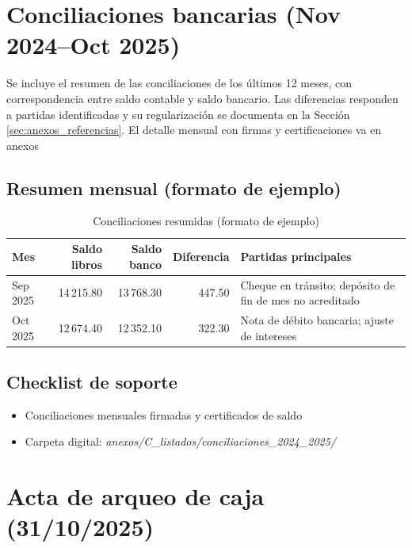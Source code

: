 \section{Conciliaciones bancarias (Nov 2024–Oct 2025)}
\label{sec:conciliaciones}

Se incluye el resumen de las conciliaciones de los últimos 12 meses, con correspondencia entre saldo contable y saldo bancario. Las diferencias responden a partidas identificadas y su regularización se documenta en la Sección \ref{sec:anexos_referencias}. El detalle mensual con firmas y certificaciones va en anexos

\subsection*{Resumen mensual (formato de ejemplo)}
\begin{table}[H]
\centering
\caption{Conciliaciones resumidas (formato de ejemplo)}
\label{tab:conciliaciones_resumen}
\begin{singlespace}
\begin{tabular}{p{2.4cm} r r r p{6.5cm}}
\toprule
\textbf{Mes} & \textbf{Saldo libros} & \textbf{Saldo banco} & \textbf{Diferencia} & \textbf{Partidas principales} \\
\midrule
Sep 2025 & 14\,215.80 & 13\,768.30 & 447.50 & Cheque en tránsito; depósito de fin de mes no acreditado \\
Oct 2025 & 12\,674.40 & 12\,352.10 & 322.30 & Nota de débito bancaria; ajuste de intereses \\
\bottomrule
\end{tabular}
\end{singlespace}
\end{table}

\subsection*{Checklist de soporte}
\begin{itemize}
  \item Conciliaciones mensuales firmadas y certificados de saldo
  \item Carpeta digital: \emph{anexos/C\_listados/conciliaciones\_2024\_2025/}
\end{itemize}

\section{Acta de arqueo de caja (31/10/2025)}
\label{sec:arqueo_caja}


